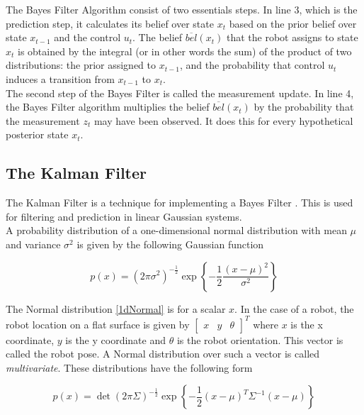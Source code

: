 \documentclass[conference]{IEEEtran}
\begin{document}
The Bayes Filter Algorithm consist of two essentials steps. In line 3, which is the prediction step, it calculates its belief over state $x_t$ based on the prior belief over state $x_{t-1}$ and the control $u_t$. The belief $\overline{bel}(x_t)$ that the robot assigns to state $x_t$ is obtained by the integral (or in other words the sum) of the product of two distributions: the prior assigned to $x_{t-1}$, and the probability that control $u_t$ induces a transition from $x_{t-1}$ to $x_t$.\\

The second step of the Bayes Filter is called the measurement update. In line 4, the Bayes Filter algorithm multiplies the belief $\overline{bel}(x_t)$ by the probability that the measurement $z_t$ may have been observed. It does this for every hypothetical posterior state $x_t$.

\subsection{The Kalman Filter}

The Kalman Filter is a technique for implementing a Bayes Filter  \cite{thrun}. This is used for filtering and prediction in linear Gaussian systems.\\

A probability distribution of a one-dimensional normal distribution with mean $\mu$ and variance $\sigma ^2$ is given by the following Gaussian function
 
 \begin{equation}\label{1dNormal}
p(x) = (2 \pi \sigma ^ 2) ^ {-\frac{1}{2}} \exp\left\{ - \frac{1}{2} \frac{(x - \mu)^2}{\sigma ^ 2} \right\}
\end{equation}

The Normal distribution \ref{1dNormal} is for a scalar $x$. In the case of a robot, the robot location on a flat surface is given by $\begin{bmatrix} x &   y & \theta \end{bmatrix}^{T}$ where $x$ is the x coordinate, $y$ is the y coordinate and $\theta$ is the robot orientation. This vector is called the robot pose. A Normal distribution over such a vector is called \textit{multivariate}. These distributions have the following form

 \begin{equation}\label{MvNormal}
p(x) = \det(2 \pi \Sigma) ^ {-\frac{1}{2}} \exp\left\{ - \frac{1}{2} (x - \mu)^T \Sigma ^ {-1} (x - \mu) \right\}
\end{equation}
\end{document}
